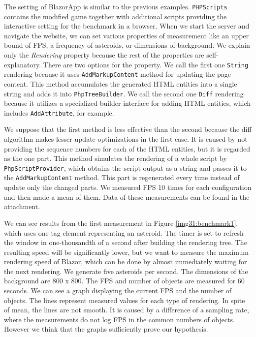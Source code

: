 The setting of BlazorApp is similar to the previous examples.
\texttt{PHPScripts} contains the modified game together with additional scripts providing the interactive setting for the benchmark in a browser.
When we start the server and navigate the website, we can set various properties of measurement like an upper bound of FPS, a frequency of asteroids, or dimensions of background.
We explain only the \textit{Rendering} property because the rest of the properties are self-explanatory.
There are two options for the property.
We call the first one \texttt{String} rendering because it uses \texttt{AddMarkupContent} method for updating the page content.
This method accumulates the generated HTML entities into a single string and adds it into \texttt{PhpTreeBuilder}.
We call the second one \texttt{Diff} rendering because it utilizes a specialized builder interface for adding HTML entities, which includes \texttt{AddAttribute}, for example.
\par
We suppose that the first method is less effective than the second because the diff algorithm makes lesser update optimizations in the first case.
It is caused by not providing the sequence numbers for each of the HTML entities, but it is regarded as the one part.
This method simulates the rendering of a whole script by \texttt{PhpScriptProvider}, which obtains the script output as a string and passes it to the \texttt{AddMarkupContent} method.
This part is regenerated every time instead of update only the changed parts.
We measured FPS 10 times for each configuration and then made a mean of them.
Data of these measurements can be found in the attachment.
\par
We can see results from the first measurement in Figure \ref{img31:benchmark1}, which uses one tag element representing an asteroid.
The timer is set to refresh the window in one-thousandth of a second after building the rendering tree.
The resulting speed will be significantly lower, but we want to measure the maximum rendering speed of Blazor, which can be done by almost immediately waiting for the next rendering. 
We generate five asteroids per second.
The dimensions of the background are 800 x 800.
The FPS and number of objects are measured for 60 seconds.
We can see a graph displaying the current FPS and the number of objects.
The lines represent measured values for each type of rendering.
In spite of mean, the lines are not smooth.
It is caused by a difference of a sampling rate, where the measurements do not log FPS in the common numbers of objects.
However we think that the graphs sufficiently prove our hypothesis.
